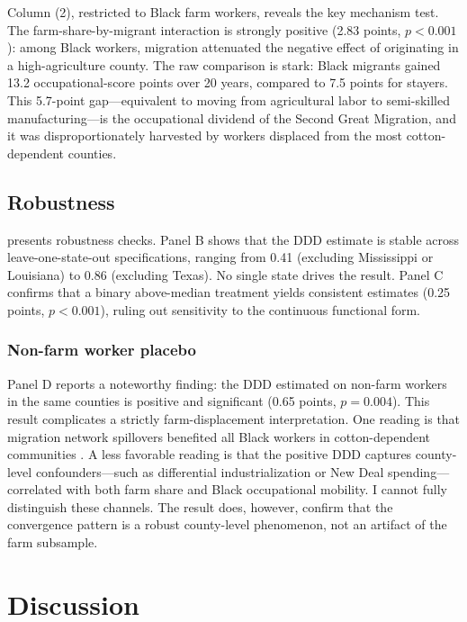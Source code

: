 \documentclass[12pt]{article}
\begin{document}
Column (2), restricted to Black farm workers, reveals the key mechanism test. The farm-share-by-migrant interaction is strongly positive (2.83 points, $p < 0.001$): among Black workers, migration attenuated the negative effect of originating in a high-agriculture county. The raw comparison is stark: Black migrants gained 13.2 occupational-score points over 20 years, compared to 7.5 points for stayers. This 5.7-point gap---equivalent to moving from agricultural labor to semi-skilled manufacturing---is the occupational dividend of the Second Great Migration, and it was disproportionately harvested by workers displaced from the most cotton-dependent counties.

\subsection{Robustness}
\label{sec:robustness}



 presents robustness checks. Panel B shows that the DDD estimate is stable across leave-one-state-out specifications, ranging from 0.41 (excluding Mississippi or Louisiana) to 0.86 (excluding Texas). No single state drives the result. Panel C confirms that a binary above-median treatment yields consistent estimates (0.25 points, $p < 0.001$), ruling out sensitivity to the continuous functional form.

\subsubsection*{Non-farm worker placebo} Panel D reports a noteworthy finding: the DDD estimated on non-farm workers in the same counties is positive and significant (0.65 points, $p = 0.004$). This result complicates a strictly farm-displacement interpretation. One reading is that migration network spillovers benefited all Black workers in cotton-dependent communities \citep{stuart2022social}. A less favorable reading is that the positive DDD captures county-level confounders---such as differential industrialization or New Deal spending---correlated with both farm share and Black occupational mobility. I cannot fully distinguish these channels. The result does, however, confirm that the convergence pattern is a robust county-level phenomenon, not an artifact of the farm subsample.

\section{Discussion}
\label{sec:discussion}
\end{document}
